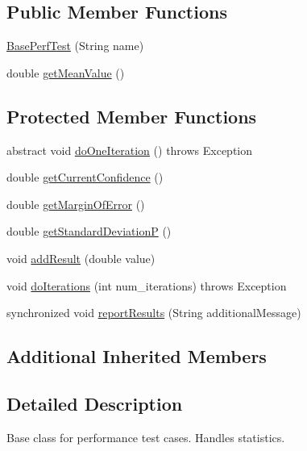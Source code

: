 \subsection*{Public Member Functions}
\begin{DoxyCompactItemize}
\item 
\mbox{\hyperlink{classtestsuite_1_1perf_1_1_base_perf_test_a31aa6418a4c1089b614c41ea0b9bd924}{Base\+Perf\+Test}} (String name)
\item 
double \mbox{\hyperlink{classtestsuite_1_1perf_1_1_base_perf_test_a27382fb187f93da07deaa8b4ce1cc3e9}{get\+Mean\+Value}} ()
\end{DoxyCompactItemize}
\subsection*{Protected Member Functions}
\begin{DoxyCompactItemize}
\item 
abstract void \mbox{\hyperlink{classtestsuite_1_1perf_1_1_base_perf_test_ac9682520790f17d153ad993c7bdf5bf4}{do\+One\+Iteration}} ()  throws Exception
\item 
double \mbox{\hyperlink{classtestsuite_1_1perf_1_1_base_perf_test_aafbdf56943e217d90ffd87d17c118af1}{get\+Current\+Confidence}} ()
\item 
double \mbox{\hyperlink{classtestsuite_1_1perf_1_1_base_perf_test_a9206b0e839cce6e668eec8c2cd94bc5c}{get\+Margin\+Of\+Error}} ()
\item 
double \mbox{\hyperlink{classtestsuite_1_1perf_1_1_base_perf_test_a72145770043104a1fe0a8a1648044aed}{get\+Standard\+DeviationP}} ()
\item 
void \mbox{\hyperlink{classtestsuite_1_1perf_1_1_base_perf_test_a4949a27d2e0b9c314d12f45128004da2}{add\+Result}} (double value)
\item 
void \mbox{\hyperlink{classtestsuite_1_1perf_1_1_base_perf_test_a5d1d0a1bf44d9feb9603a2c98705c6c6}{do\+Iterations}} (int num\+\_\+iterations)  throws Exception 
\item 
synchronized void \mbox{\hyperlink{classtestsuite_1_1perf_1_1_base_perf_test_a88bddb3492e88ede49a0b70c63dc47b1}{report\+Results}} (String additional\+Message)
\end{DoxyCompactItemize}
\subsection*{Additional Inherited Members}


\subsection{Detailed Description}
Base class for performance test cases. Handles statistics. 

